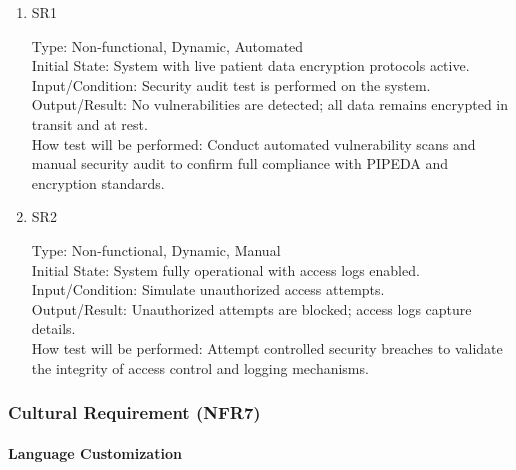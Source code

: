\documentclass[12pt, titlepage]{article}
\begin{document}
\begin{enumerate}
    \item{SR1\\}
    
    Type: Non-functional, Dynamic, Automated\\
    
    Initial State: System with live patient data encryption protocols active.\\
    
    Input/Condition: Security audit test is performed on the system.\\
    
    Output/Result: No vulnerabilities are detected; all data remains encrypted in transit and at rest.\\
    
    How test will be performed: Conduct automated vulnerability scans and manual security audit to confirm full compliance with PIPEDA and encryption standards.

    \item{SR2\\}
    
    Type: Non-functional, Dynamic, Manual\\
    
    Initial State: System fully operational with access logs enabled.\\
    
    Input/Condition: Simulate unauthorized access attempts.\\
    
    Output/Result: Unauthorized attempts are blocked; access logs capture details.\\
    
    How test will be performed: Attempt controlled security breaches to validate the integrity of access control and logging mechanisms.
\end{enumerate}

\subsubsection{Cultural Requirement (NFR7)}

\paragraph{Language Customization}
\end{document}
